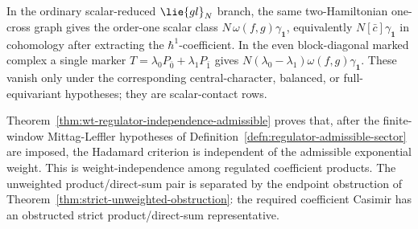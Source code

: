 \begin{rmk}\label{rmk:finite-window-scalar-condition-boundary}
  In the ordinary scalar-reduced \(\lie{gl}_N\) branch, the same
  two-Hamiltonian one-cross graph gives the order-one scalar class
  \(N\,\omega(f,g)\gamma_{\mathbf 1}\), equivalently
  \(N[\bar c]\gamma_{\mathbf 1}\) in cohomology after extracting the
  \(\hbar^1\)-coefficient.  In the even block-diagonal marked complex a
  single marker
  \(T=\lambda_0P_{\bar0}+\lambda_1P_{\bar1}\) gives
  \(N(\lambda_0-\lambda_1)\omega(f,g)\gamma_{\mathbf 1}\).  These vanish
  only under the corresponding central-character, balanced, or
  full-equivariant hypotheses; they are scalar-contact rows.
\end{rmk}

\begin{rmk}\label{rmk:hadamard-regulator-independence}
  Theorem~\ref{thm:wt-regulator-independence-admissible} proves that,
  after the finite-window Mittag-Leffler hypotheses of
  Definition~\ref{defn:regulator-admissible-sector} are imposed, the
  Hadamard criterion is independent of the admissible exponential
  weight.  This is weight-independence among regulated coefficient
  products.  The unweighted product/direct-sum pair is separated by the
  endpoint obstruction of Theorem~\ref{thm:strict-unweighted-obstruction}: the
  required coefficient Casimir has an obstructed strict product/direct-sum
  representative.
\end{rmk}

